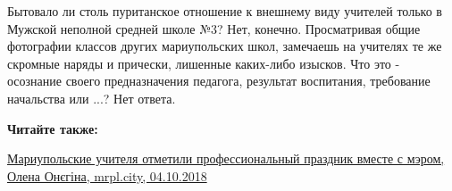Бытовало ли столь пуританское отношение к внешнему виду учителей только в
Мужской неполной средней школе №3? Нет, конечно. Просматривая общие фотографии
классов других мариупольских школ,  замечаешь на учителях те же скромные наряды
и прически, лишенные каких-либо изысков. Что это -  осознание своего
предназначения педагога, результат воспитания, требование начальства или ...?
Нет ответа.

\textbf{Читайте также:} 

\href{https://mrpl.city/news/view/mariupolskie-uchitelya-otmetili-professionalnyj-prazdnik-vmeste-s-me-rom-foto}{Мариупольские учителя отметили профессиональный праздник вместе с мэром, Олена Онєгіна, mrpl.city, 04.10.2018}
